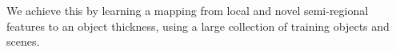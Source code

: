 \documentclass[10pt,twocolumn,letterpaper]{article}
\makeatletter
\renewcommand*{\ie}{i.e.\@\xspace}
\makeatother
\begin{document}
We achieve this by learning a mapping from local and novel semi-regional features to an object thickness, using a large collection of training objects and scenes.









\end{document}
